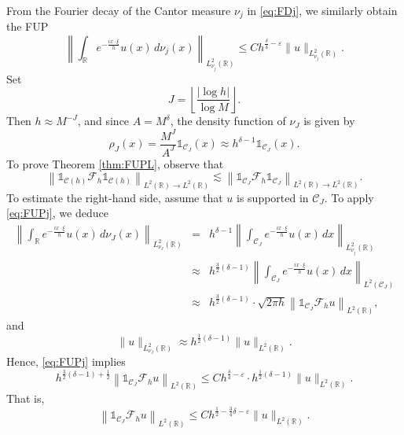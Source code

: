 \documentclass[12pt,reqno]{amsart}
\newcommand\Cc{\mathcal{C}}
\newcommand\Char{\mathds{1}}
\newcommand\Fc{\mathcal{F}}
\newcommand\R{\mathbb{R}}
\newcommand\ve{\varepsilon}
\theoremstyle{plain}
\theoremstyle{remark}
\numberwithin{equation}{section}
\begin{document}
From the Fourier decay of the Cantor measure $\nu_j$ in \eqref{eq:FDj}, we similarly obtain the FUP 
\begin{equation}\label{eq:FUPj}
\left\|\int_{\R}e^{-\frac{ix\cdot \xi}{h}}u(x)\,d\nu_j(x)\right\|_{L^2_{\nu_j}(\R)}\le Ch^{\frac\delta4-\ve}\|u\|_{L^2_{\nu_j}(\R)}.
\end{equation}
Set
$$J=\left\lfloor\frac{|\log h|}{\log M}\right\rfloor.$$
Then $h\approx M^{-J}$, and since $A=M^\delta$, the density function of $\nu_J$ is given by
$$\rho_J(x)=\frac{M^J}{A^J}\Char_{\Cc_J}(x)\approx h^{\delta-1}\Char_{\Cc_J}(x).$$
To prove Theorem \ref{thm:FUPL}, observe that
$$\left\|\Char_{\Cc(h)}\Fc_h\Char_{\Cc(h)}\right\|_{L^2(\R)\to L^2(\R)}\lesssim\left\|\Char_{\Cc_J}\Fc_h\Char_{\Cc_J}\right\|_{L^2(\R)\to L^2(\R)}.$$
To estimate the right-hand side, assume that $u$ is supported in $\Cc_J$. To apply \eqref{eq:FUPj}, we deduce
\begin{eqnarray*}
\left\|\int_{\R}e^{-\frac{ix\cdot \xi}{h}}u(x)\,d\nu_J(x)\right\|_{L^2_{\nu_J}(\R)}&=&h^{\delta-1}\left\|\int_{\Cc_J}e^{-\frac{ix\cdot \xi}{h}}u(x)\,dx\right\|_{L^2_{\nu_j}(\R)}\\
&\approx&h^{\frac32(\delta-1)}\left\|\int_{\Cc_J}e^{-\frac{ix\cdot \xi}{h}}u(x)\,dx\right\|_{L^2(\Cc_J)}\\
&\approx&h^{\frac32(\delta-1)}\cdot\sqrt{2\pi h}\left\|\Char_{\Cc_J}\Fc_hu\right\|_{L^2(\R)},
\end{eqnarray*}
and
$$\|u\|_{L^2_{\nu_J}(\R)}\approx h^{\frac12(\delta-1)}\|u\|_{L^2(\R)}.$$
Hence, \eqref{eq:FUPj} implies
$$h^{\frac32(\delta-1)+\frac12}\left\|\Char_{\Cc_J}\Fc_hu\right\|_{L^2(\R)}\le Ch^{\frac\delta4-\ve}\cdot h^{\frac12(\delta-1)}\|u\|_{L^2(\R)}.$$
That is,
$$\left\|\Char_{\Cc_J}\Fc_hu\right\|_{L^2(\R)}\le Ch^{\frac12-\frac34\delta-\ve}\|u\|_{L^2(\R)}.$$
\end{document}
